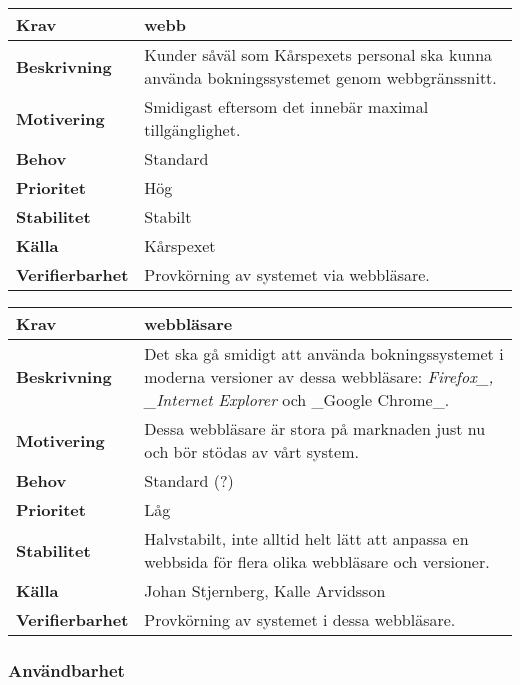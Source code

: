 \documentclass[a4paper, twoside, 11pt, titlepage]{article}
\begin{document}
		\begin{tabular} { | p{3cm} | p{12.2cm} | }
			\hline
			\textbf{Krav} & webb  \\
			\hline
			\textbf{Beskrivning} & Kunder såväl som Kårspexets personal ska kunna använda bokningssystemet genom webbgränssnitt.  \\
			\hline
			\textbf{Motivering} & Smidigast eftersom det innebär maximal tillgänglighet.  \\
			\hline
			\textbf{Behov} & Standard  \\
			\hline
			\textbf{Prioritet} & Hög  \\
			\hline
			\textbf{Stabilitet} & Stabilt  \\
			\hline
			\textbf{Källa} & Kårspexet  \\
			\hline
			\textbf{Verifierbarhet} & Provkörning av systemet via webbläsare.  \\
			\hline
		\end{tabular}

		\begin{tabular} { | p{3cm} | p{12.2cm} | }
			\hline
			\textbf{Krav} & webbläsare  \\
			\hline
			\textbf{Beskrivning} & Det ska gå smidigt att använda bokningssystemet i moderna versioner av dessa webbläsare: \emph{Firefox\_, \_Internet Explorer} och \_Google Chrome\_.  \\
			\hline
			\textbf{Motivering} & Dessa webbläsare är stora på marknaden just nu och bör stödas av vårt system.  \\
			\hline
			\textbf{Behov} & Standard (?)  \\
			\hline
			\textbf{Prioritet} & Låg  \\
			\hline
			\textbf{Stabilitet} & Halvstabilt, inte alltid helt lätt att anpassa en webbsida för flera olika webbläsare och versioner.  \\
			\hline
			\textbf{Källa} & Johan Stjernberg, Kalle Arvidsson  \\
			\hline
			\textbf{Verifierbarhet} & Provkörning av systemet i dessa webbläsare.  \\
			\hline
		\end{tabular}


	\subsubsection{Användbarhet}
\end{document}

